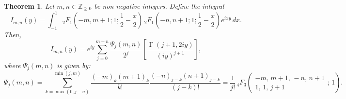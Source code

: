 \documentclass[12pt]{article}
\newtheorem{theorem}{Theorem}
\DeclareMathOperator{\gamma}{\Gamma}
\begin{document}
\begin{theorem}\label{thm:EvaluationOfIntegral}
Let $m, n \in \mathbb{Z}_{\geq 0}$ be non-negative integers. Define the integral
\[
I_{m,n}(y) = \int_{-1}^1 {}_2F_1\left(-m, m+1; 1; \frac{1}{2}-\frac{x}{2}\right)
\, {}_2F_1\left(-n, n+1; 1; \frac{1}{2}-\frac{x}{2}\right) e^{i x y}\, dx.
\]
Then,
\[
I_{m,n}(y) = e^{iy}\sum_{j=0}^{m+n}\frac{\Psi_j(m,n)}{2^j}\left[\frac{\gamma(j+1,2iy)}{(iy)^{j+1}}\right],
\]
where $\Psi_j(m,n)$ is given by:
\begin{equation}\label{eq:PsiEquality}
\Psi_j(m,n) = \sum_{k=\max(0,j-n)}^{\min(j,m)}\frac{(-m)_k(m+1)_k}{k!}\frac{(-n)_{j-k}(n+1)_{j-k}}{(j-k)!} = \frac{1}{j!}\, {}_4F_3\left(
\begin{matrix}
-m,\, m+1,\, -n,\, n+1 \\
1,\, 1,\, j+1
\end{matrix};\, 1\right).
\end{equation}
\end{theorem}
\end{document}
